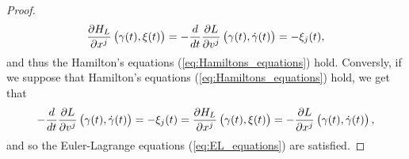 \begin{proof}
\begin{equation*}
		\frac{\partial H_L}{\partial x^j}\del[1]{\gamma(t),\xi(t)} = -\frac{d}{dt}\frac{\partial L}{\partial v^j}\del[1]{\gamma(t),\dot{\gamma}(t)} = -\xi_j(t),
	\end{equation*}
	\noindent and thus the Hamilton's equations (\ref{eq:Hamiltons_equations}) hold. Conversly, if we suppose that Hamilton's equations (\ref{eq:Hamiltons_equations}) hold, we get that
	\begin{equation*}
		-\frac{d}{dt}\frac{\partial L}{\partial v^j}\del[1]{\gamma(t),\dot{\gamma}(t)} = -\xi_j(t) = \frac{\partial H_L}{\partial x^j}\del[1]{\gamma(t),\xi(t)} = -\frac{\partial L}{\partial x^j}\del[1]{\gamma(t),\dot{\gamma}(t)},
	\end{equation*}
	\noindent and so the Euler-Lagrange equations (\ref{eq:EL_equations}) are satisfied.
\end{proof}
